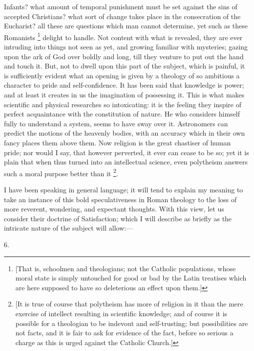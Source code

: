 Infants? what amount of temporal punishment must be set against the
sins of accepted Christians? what sort of change takes place in the
consecration of the Eucharist? all these are questions which man
cannot determine, yet such as these Romanists \footnote{[That is, schoolmen and theologians; not
the Catholic populations, whose moral state is simply untouched for
good or bad by the Latin treatises which are here supposed to have so
deleterious an effect upon them.]} delight to handle. Not content with what is revealed, they are
ever intruding into things not seen as yet, and growing familiar with
mysteries; gazing upon the ark of God over boldly and long, till they
venture to put out the hand and touch it. But, not to dwell upon this
part of the subject, which is painful, it is sufficiently evident what
an opening is given by a theology of so ambitious a character to pride
and self-confidence. It has been said that knowledge is power; and at
least it creates in us the imagination of possessing it. This is what
makes scientific and physical researches so intoxicating: it is
the feeling they inspire of perfect acquaintance with the constitution
of nature. He who considers himself fully to understand a system,
seems to have sway over it. Astronomers can predict the motions of the
heavenly bodies, with an accuracy which in their own fancy places them
above them. Now religion is the great chastiser of human pride; nor
would I say, that however perverted, it ever can cease to be so; yet
it is plain that when thus turned into an intellectual science, even
polytheism answers such a moral purpose better than it \footnote{[It is true of course that polytheism has
more of religion in it than the mere exercise of intellect resulting
in scientific knowledge; and of course it is possible for a theologian
to be indevout and self-trusting; but possibilities are not facts, and
it is fair to ask for evidence of the fact, before so serious a charge
as this is urged against the Catholic Church.]}.

I have been speaking in general language; it will tend to explain
my meaning to take an instance of this bold speculativeness in Roman
theology to the loss of more reverent, wondering, and expectant
thoughts. With this view, let us consider their doctrine of
Satisfaction; which I will describe as briefly as the intricate nature
of the subject will allow:—

6.

